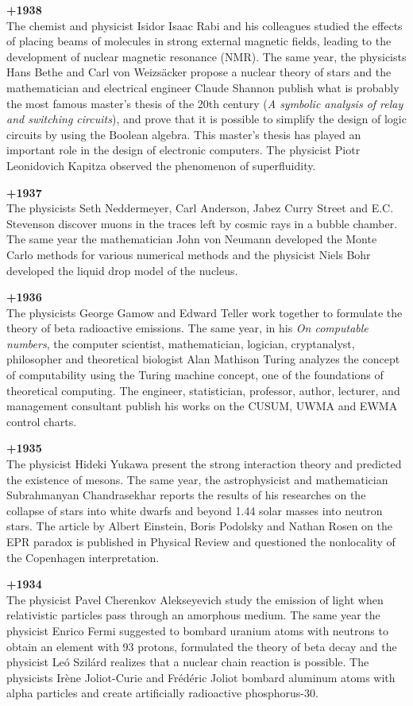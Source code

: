 \textbf{+1938}\\
The chemist and physicist Isidor Isaac Rabi and his colleagues studied the effects of placing beams of molecules in strong external magnetic fields, leading to the development of nuclear magnetic resonance (NMR). The same year, the physicists Hans Bethe and Carl von Weizsäcker propose a nuclear theory of stars and the mathematician and electrical engineer Claude Shannon publish what is probably the most famous master's thesis of the 20th century (\textit{A symbolic analysis of relay and switching circuits}), and prove that it is possible to simplify the design of logic circuits by using the Boolean algebra. This master's thesis has played an important role in the design of electronic computers. The physicist Piotr Leonidovich Kapitza observed the phenomenon of superfluidity.

\textbf{+1937}\\
The physicists Seth Neddermeyer, Carl Anderson, Jabez Curry Street and E.C. Stevenson discover muons in the traces left by cosmic rays in a bubble chamber. The same year the mathematician John von Neumann developed the Monte Carlo methods for various numerical methods and the physicist Niels Bohr developed the liquid drop model of the nucleus.

\textbf{+1936}\\
The physicists George Gamow and Edward Teller work together to formulate the theory of beta radioactive emissions. The same year, in his \textit{On computable numbers}, the computer scientist, mathematician, logician, cryptanalyst, philosopher and theoretical biologist Alan Mathison Turing analyzes the concept of computability using the Turing machine concept, one of the foundations of theoretical computing. The engineer, statistician, professor, author, lecturer, and management consultant publish his works on the CUSUM, UWMA and EWMA control charts.

\textbf{+1935}\\
The physicist Hideki Yukawa present the strong interaction theory and predicted the existence of mesons. The same year, the astrophysicist and mathematician Subrahmanyan Chandrasekhar reports the results of his researches on the collapse of stars into white dwarfs and beyond 1.44 solar masses into neutron stars. The article by Albert Einstein, Boris Podolsky and Nathan Rosen on the EPR paradox is published in Physical Review and questioned the nonlocality of the Copenhagen interpretation.

\textbf{+1934}\\
The physicist Pavel Cherenkov Alekseyevich study the emission of light when relativistic particles pass through an amorphous medium. The same year the physicist Enrico Fermi suggested to bombard uranium atoms with neutrons to obtain an element with 93 protons, formulated the theory of beta decay and the physicist Leó Szilárd realizes that a nuclear chain reaction is possible. The physicists Irène Joliot-Curie and Frédéric Joliot bombard aluminum atoms with alpha particles and create artificially radioactive phosphorus-30.

